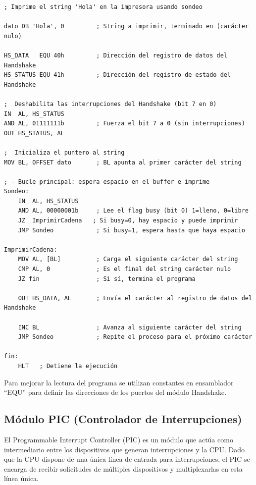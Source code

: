 \documentclass[12pt,oneside]{templates/unerthesis}
\begin{document}
\begin{lstlisting}
; Imprime el string 'Hola' en la impresora usando sondeo

dato DB 'Hola', 0         ; String a imprimir, terminado en (carácter nulo)

HS_DATA   EQU 40h         ; Dirección del registro de datos del Handshake
HS_STATUS EQU 41h         ; Dirección del registro de estado del Handshake

;  Deshabilita las interrupciones del Handshake (bit 7 en 0) 
IN  AL, HS_STATUS
AND AL, 01111111b         ; Fuerza el bit 7 a 0 (sin interrupciones)
OUT HS_STATUS, AL

;  Inicializa el puntero al string 
MOV BL, OFFSET dato       ; BL apunta al primer carácter del string

; - Bucle principal: espera espacio en el buffer e imprime 
Sondeo:
    IN  AL, HS_STATUS
    AND AL, 00000001b     ; Lee el flag busy (bit 0) 1=lleno, 0=libre
    JZ  ImprimirCadena   ; Si busy=0, hay espacio y puede imprimir
    JMP Sondeo            ; Si busy=1, espera hasta que haya espacio

ImprimirCadena:
    MOV AL, [BL]          ; Carga el siguiente carácter del string
    CMP AL, 0             ; Es el final del string carácter nulo
    JZ fin                ; Si sí, termina el programa

    OUT HS_DATA, AL       ; Envía el carácter al registro de datos del Handshake

    INC BL                ; Avanza al siguiente carácter del string
    JMP Sondeo            ; Repite el proceso para el próximo carácter

fin:
    HLT   ; Detiene la ejecución\end{lstlisting}

Para mejorar la lectura del programa se utilizan constantes en ensamblador ``EQU'' para definir las direcciones de los puertos del módulo Handshake.

\hypertarget{muxf3dulo-pic-controlador-de-interrupciones}{%
\subsection{Módulo PIC (Controlador de Interrupciones)}\label{muxf3dulo-pic-controlador-de-interrupciones}}

El Programmable Interrupt Controller (PIC) es un módulo que actúa como intermediario entre los dispositivos que generan interrupciones y la CPU. Dado que la CPU dispone de una única línea de entrada para interrupciones, el PIC se encarga de recibir solicitudes de múltiples dispositivos y multiplexarlas en esta línea única.
\end{document}
